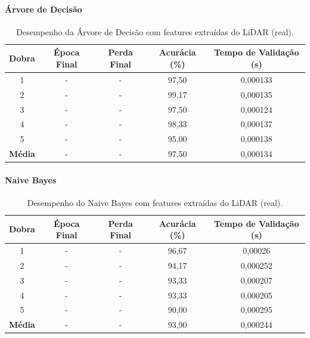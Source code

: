 \paragraph{Árvore de Decisão}

\begin{table}[H]
\caption{Desempenho da Árvore de Decisão com features extraídas do LiDAR (real).}
\centering
\begin{tabular}{ccccc}
\hline
\textbf{Dobra} & \textbf{Época Final} & \textbf{Perda Final} & \textbf{Acurácia (\%)} & \textbf{Tempo de Validação (s)}  \\
\hline
1 & - & - & 97,50 & 0,000133 \\
2 & - & - & 99,17 & 0,000135 \\
3 & - & - & 97,50 & 0,000124 \\
4 & - & - & 98,33 & 0,000137 \\
5 & - & - & 95,00 & 0,000138 \\
\hline
\textbf{Média} & - & - & 97,50 & 0,000134 \\
\hline
\end{tabular}
\fonte{}
\label{tab:arvore_decisao_features_imagens_real}
\end{table}

\paragraph{Naive Bayes}

\begin{table}[H]
\caption{Desempenho do Naive Bayes com features extraídas do LiDAR (real).}
\centering
\begin{tabular}{ccccc}
\hline
\textbf{Dobra} & \textbf{Época Final} & \textbf{Perda Final} & \textbf{Acurácia (\%)} & \textbf{Tempo de Validação (s)}  \\
\hline
1 & - & - & 96,67 & 0,00026 \\
2 & - & - & 94,17 & 0,000252 \\
3 & - & - & 93,33 & 0,000207 \\
4 & - & - & 93,33 & 0,000205 \\
5 & - & - & 90,00 & 0,000295 \\
\hline
\textbf{Média} & - & - & 93,90 & 0,000244 \\
\hline
\end{tabular}
\fonte{}
\label{tab:naive_bayes_features_imagens_real}
\end{table}

